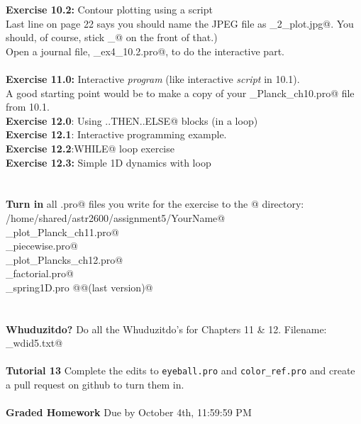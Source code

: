 \documentclass{article}
\newcommand{\hmwkDueDate}{October 4th, 11:59:59 PM}
\begin{document}
\begin{spacing}{1.0}
 \textbf{Exercise 10.2:} Contour plotting using a script  \\
 Last line on page 22 says you should name the JPEG file as
 _2_plot.jpg@.  You should, of course, stick \verb@YourName_@ on the
 front of that.) \\
 Open a journal file, \verb@YourName_ex4_10.2.pro@, to do the interactive part. 
 ~\\
~\\ 
 \textbf{Exercise 11.0:} Interactive \emph{program} (like interactive \emph{script} in 10.1). \\
   A good starting point would be to make a copy of your \verb@plot_Planck_ch10.pro@ file from 10.1. \\
 \textbf{Exercise 12.0}: Using \verb@IF..THEN..ELSE@ blocks (in a \verb@FOR@ loop) \\
 \textbf{Exercise 12.1}: Interactive programming example. \\
 \textbf{Exercise 12.2}:\verb@ WHILE@ loop exercise \\
 \textbf{Exercise 12.3:} Simple 1D dynamics with \verb@FOR@ loop \\
 ~\\
~\\ 
 \textbf{Turn in} all \verb@.pro@ files you write for the exercise to the
 @ directory: \\
 \verb@/home/shared/astr2600/assignment5/YourName@  \\
 \verb@YourName_plot_Planck_ch11.pro@  \\
 \verb@YourName_piecewise.pro@  \\
 \verb@YourName_plot_Plancks_ch12.pro@  \\
 \verb@YourName_factorial.pro@  \\
 \verb@YourName_spring1D.pro @\verb@    @\verb@(last version)@  \\
 ~\\
~\\ 
 \textbf{Whuduzitdo?}  Do all the Whuduzitdo’s for Chapters 11 \& 12.  Filename: \verb@YourName_wdid5.txt@ 
 ~\\
~\\ 
\textbf{Tutorial 13}  Complete the edits to \verb|eyeball.pro| and
\verb|color_ref.pro| and create a pull request on github to turn them in.
 ~\\
~\\ 
 \newpage \textbf{Graded Homework}\textbf{  }Due by \hmwkDueDate 
 ~\\
~\\ 

\end{spacing}
\end{document}
